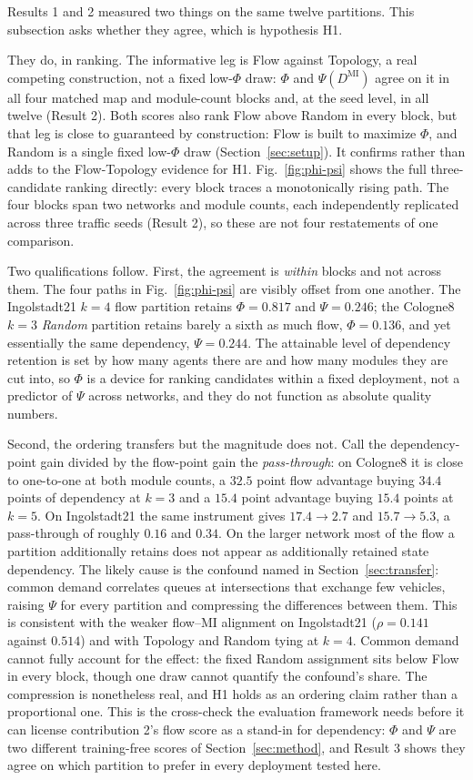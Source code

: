 \documentclass[journal]{IEEEtran}
\theoremstyle{definition}
\begin{document}
Results 1 and 2 measured two things on the same twelve partitions. This
subsection asks whether they agree, which is hypothesis H1.

They do, in ranking.
The informative leg is Flow against Topology, a real competing construction,
not a fixed low-$\Phi$ draw: $\Phi$ and $\Psi(D^{\mathrm{MI}})$ agree on it in
all four matched map and module-count blocks and, at the seed level, in all
twelve (Result 2). Both scores also rank Flow above Random in every block, but
that leg is close to guaranteed by construction: Flow is built to maximize
$\Phi$, and Random is a single fixed low-$\Phi$ draw (Section~\ref{sec:setup}).
It confirms rather than adds to the Flow-Topology evidence for H1.
Fig.~\ref{fig:phi-psi} shows the full three-candidate ranking directly: every
block traces a monotonically rising path.
The four blocks span two networks and module counts, each independently
replicated across three traffic seeds (Result 2), so these are not four
restatements of one comparison.

Two qualifications follow.
First, the agreement is \emph{within} blocks and not across them.
The four paths in Fig.~\ref{fig:phi-psi} are visibly offset from one another.
The Ingolstadt21 $k=4$ flow partition retains $\Phi=0.817$ and
$\Psi=0.246$; the Cologne8 $k=3$ \emph{Random} partition retains barely a
sixth as much flow, $\Phi=0.136$, and yet essentially the same dependency,
$\Psi=0.244$.
The attainable level of dependency retention is set by how many agents there
are and how many modules they are cut into, so $\Phi$ is a device for ranking
candidates within a fixed deployment, not a predictor of $\Psi$ across
networks, and they do not function as absolute quality numbers.

Second, the ordering transfers but the magnitude does not.
Call the dependency-point gain divided by the flow-point gain the
\emph{pass-through}: on Cologne8 it is close to one-to-one at both module
counts, a $32.5$ point flow advantage buying $34.4$ points of dependency at
$k=3$ and a $15.4$ point advantage buying $15.4$ points at $k=5$.
On Ingolstadt21 the same instrument gives $17.4 \to 2.7$ and $15.7 \to 5.3$,
a pass-through of roughly $0.16$ and $0.34$.
On the larger network most of the flow a partition additionally retains does
not appear as additionally retained state dependency.
The likely cause is the confound named in Section~\ref{sec:transfer}: common
demand correlates queues at intersections that exchange few vehicles, raising
$\Psi$ for every partition and compressing the differences between them.
This is consistent with the weaker flow--MI alignment on Ingolstadt21
($\rho=0.141$ against $0.514$) and with Topology and Random tying at $k=4$.
Common demand cannot fully account for the effect: the fixed Random
assignment sits below Flow in every block, though one draw cannot quantify
the confound's share.
The compression is nonetheless real, and H1 holds as an ordering claim rather
than a proportional one.
This is the cross-check the evaluation framework needs before it can license
contribution 2's flow score as a stand-in for dependency: $\Phi$ and $\Psi$
are two different training-free scores of Section~\ref{sec:method}, and
Result 3 shows they agree on which partition to prefer in every deployment
tested here.
\end{document}
